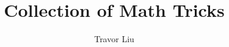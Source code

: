 \documentclass[12pt]{article}
\title{Collection of Math Tricks}
\author{Travor Liu}
\begin{document}
\maketitle





\pagebreak

\pagebreak

\pagebreak

\pagebreak

\pagebreak

\pagebreak

\pagebreak

\end{document}

